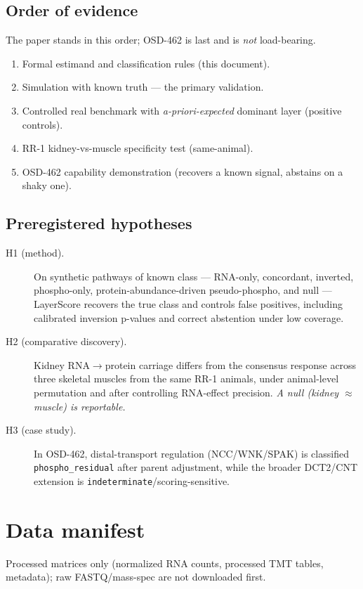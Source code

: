 \documentclass[11pt]{article}
\newcommand{\Cpho}{\texttt{phospho\_residual}}
\newcommand{\Cind}{\texttt{indeterminate}}
\begin{document}
\subsection{Order of evidence}
The paper stands in this order; OSD-462 is last and is \emph{not} load-bearing.
\begin{enumerate}
\item Formal estimand and classification rules (this document).
\item Simulation with known truth --- the primary validation.
\item Controlled real benchmark with \emph{a-priori-expected} dominant layer (positive controls).
\item RR-1 kidney-vs-muscle specificity test (same-animal).
\item OSD-462 capability demonstration (recovers a known signal, abstains on a shaky one).
\end{enumerate}

\subsection{Preregistered hypotheses}
\begin{description}
\item[H1 (method).] On synthetic pathways of known class --- RNA-only, concordant, inverted, phospho-only,
protein-abundance-driven pseudo-phospho, and null --- LayerScore recovers the true class and controls false
positives, including calibrated inversion p-values and correct abstention under low coverage.
\item[H2 (comparative discovery).] Kidney RNA$\rightarrow$protein carriage differs from the consensus
response across three skeletal muscles from the same RR-1 animals, under animal-level permutation and after
controlling RNA-effect precision. \emph{A null (kidney $\approx$ muscle) is reportable.}
\item[H3 (case study).] In OSD-462, distal-transport regulation (NCC/WNK/SPAK) is classified \Cpho{} after
parent adjustment, while the broader DCT2/CNT extension is \Cind{}/scoring-sensitive.
\end{description}

\section{Data manifest}
Processed matrices only (normalized RNA counts, processed TMT tables, metadata); raw FASTQ/mass-spec are not
downloaded first.
\end{document}
